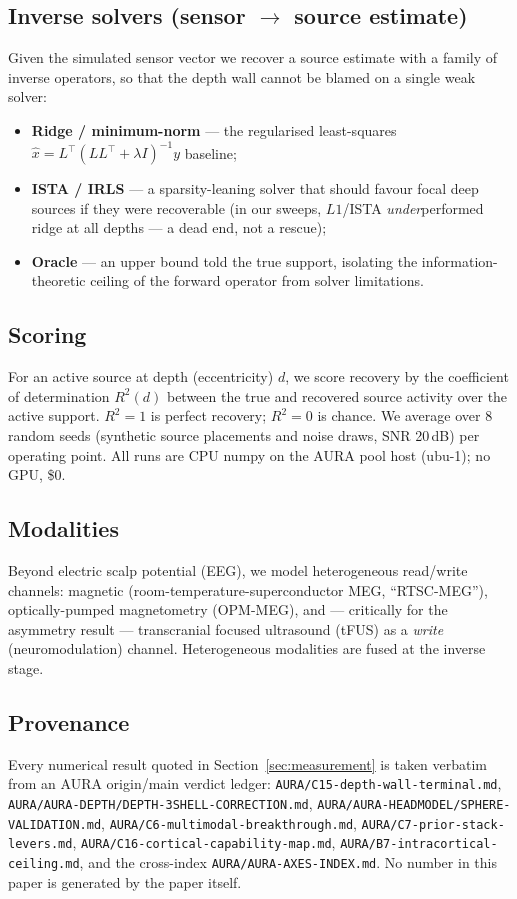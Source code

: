 \documentclass[11pt]{article}
\newcommand{\Rsq}{R^{2}}
\begin{document}
\subsection{Inverse solvers (sensor $\rightarrow$ source estimate)}
Given the simulated sensor vector we recover a source estimate with a family of
inverse operators, so that the depth wall cannot be blamed on a single weak solver:
\begin{itemize}[leftmargin=2em]
  \item \textbf{Ridge / minimum-norm} --- the regularised least-squares
        $\hat{x} = L^{\!\top}(LL^{\!\top}+\lambda I)^{-1} y$ baseline;
  \item \textbf{ISTA / IRLS} --- a sparsity-leaning solver that should favour focal
        deep sources if they were recoverable (in our sweeps, $L1$/ISTA
        \emph{under}performed ridge at all depths --- a dead end, not a rescue);
  \item \textbf{Oracle} --- an upper bound told the true support, isolating the
        information-theoretic ceiling of the forward operator from solver
        limitations.
\end{itemize}

\subsection{Scoring}
For an active source at depth (eccentricity) $d$, we score recovery by the
coefficient of determination $\Rsq(d)$ between the true and recovered source activity
over the active support. $\Rsq = 1$ is perfect recovery; $\Rsq = 0$ is chance. We
average over 8 random seeds (synthetic source placements and noise draws, SNR
20\,dB) per operating point. All runs are CPU numpy on the AURA pool host (ubu-1);
no GPU, \$0.

\subsection{Modalities}
Beyond electric scalp potential (EEG), we model heterogeneous read/write channels:
magnetic (room-temperature-superconductor MEG, ``RTSC-MEG''), optically-pumped
magnetometry (OPM-MEG), and --- critically for the asymmetry result --- transcranial
focused ultrasound (tFUS) as a \emph{write} (neuromodulation) channel. Heterogeneous
modalities are fused at the inverse stage.

\subsection{Provenance}
Every numerical result quoted in Section~\ref{sec:measurement} is taken verbatim
from an AURA origin/main verdict ledger:
\texttt{AURA/C15-depth-wall-terminal.md},
\texttt{AURA/AURA-DEPTH/DEPTH-3SHELL-CORRECTION.md},
\texttt{AURA/AURA-HEADMODEL/SPHERE-VALIDATION.md},
\texttt{AURA/C6-multimodal-breakthrough.md},
\texttt{AURA/C7-prior-stack-levers.md},
\texttt{AURA/C16-cortical-capability-map.md},
\texttt{AURA/B7-intracortical-ceiling.md}, and the cross-index
\texttt{AURA/AURA-AXES-INDEX.md}. No number in this paper is generated by the paper
itself.
\end{document}
